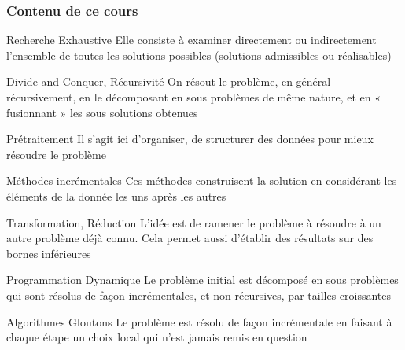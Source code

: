 \documentclass[aspectratio=1610,francais,envcountsect]{beamer}
\begin{document}
\begin{frame}[allowframebreaks]
  \frametitle{Contenu de ce cours}

  \begin{block}{Recherche Exhaustive}
    Elle consiste à examiner directement ou indirectement l'ensemble
    de toutes les solutions possibles (solutions admissibles ou
    réalisables)
  \end{block}

\begin{block}{Divide-and-Conquer, Récursivité}
  On résout le problème, en général récursivement, en le décomposant
  en sous problèmes de même nature, et en « fusionnant » les sous
  solutions obtenues
\end{block}

\begin{block}{Prétraitement}
  Il s'agit ici d'organiser, de structurer des données pour mieux
  résoudre le problème
\end{block}

\begin{block}{Méthodes incrémentales}
  Ces méthodes construisent la solution en considérant les éléments de
  la donnée les uns après les autres
\end{block}

\begin{block}{Transformation, Réduction}
  L'idée est de ramener le problème à résoudre à un autre problème
  déjà connu. Cela permet aussi d'établir des résultats sur des bornes
  inférieures
\end{block}

\begin{block}{Programmation Dynamique}
  Le problème initial est décomposé en sous problèmes qui sont résolus
  de façon incrémentales, et non récursives, par tailles croissantes
\end{block}

\begin{block}{Algorithmes Gloutons}
  Le problème est résolu de façon incrémentale en faisant à chaque
  étape un choix local qui n'est jamais remis en question
\end{block}



\end{frame}
\end{document}
